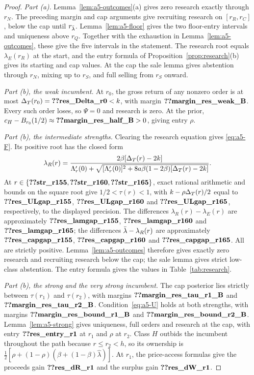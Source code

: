 \begin{proof}
\emph{Part (a).} Lemma~\ref{lem:a5-outcomes}(a) gives zero research exactly through \(r_N\).
The preceding margin and cap arguments give recruiting research on \([r_R,r_C]\), below the cap until
\(r_{\bar\lambda}\). Lemma~\ref{lem:a5-floor} gives the two floor-entry intervals and uniqueness above \(r_Q\).
Together with the exhaustion in Lemma~\ref{lem:a5-outcomes}, these give the five intervals in the statement.
The research root equals \(\lambda_E(r_R)\) at the start, and the entry formula of
Proposition~\ref{prop:research}(b) gives its starting and cap values. At the cap the sale lemma gives
abstention through \(r_N\), mixing up to \(r_S\), and full selling from \(r_S\) onward.

\emph{Part (b), the weak incumbent.} At \(r_0\), the gross return of any nonzero order is at most
\(\DT(r_0)=\reg{res_Delta_r0}<k\), with margin \(\reg{margin_res_weak_B}\).
Every such order loses, so \(\Psi=0\) and research is zero. At the prior,
\(c_H-B_{r_0}(1/2)\approx\reg{margin_res_half_B}>0\), giving entry \(\rho\).

\emph{Part (b), the intermediate strengths.} Clearing the research equation gives \eqref{eq:a5-F}.
Its positive root has the closed form
\[
 \lambda_R(r)=
 \frac{2\beta[\Delta_T(r)-2k]}
 {\Lambda_r'(0)+\sqrt{[\Lambda_r'(0)]^2+
 8a\beta(1-2\beta)[\Delta_T(r)-2k]}}.
\]
At \(r\in\{\reg{str_r155},\reg{str_r160},\reg{str_r165}\}\), exact rational arithmetic and bounds on
the square root give \(1/2<\tau(r)<1\), with
\(k-\rho\Delta_T(r)/2\) equal to \(\reg{res_ULgap_r155}\), \(\reg{res_ULgap_r160}\) and
\(\reg{res_ULgap_r165}\), respectively, to the displayed precision.
The differences \(\lambda_R(r)-\lambda_E(r)\) are approximately
\(\reg{res_lamgap_r155}\), \(\reg{res_lamgap_r160}\) and \(\reg{res_lamgap_r165}\);
the differences \(\bar\lambda-\lambda_R(r)\) are approximately
\(\reg{res_capgap_r155}\), \(\reg{res_capgap_r160}\) and \(\reg{res_capgap_r165}\).
All are strictly positive. Lemma~\ref{lem:a5-outcomes} therefore gives exactly zero research and recruiting
research below the cap; the sale lemma gives strict low-class abstention. The entry formula gives the
values in Table~\ref{tab:research}.

\emph{Part (b), the strong and the very strong incumbent.} The cap posterior lies strictly between
\(\tau(r_1)\) and \(\tau(r_2)\), with margins \(\reg{margin_res_tau_r1_B}\) and
\(\reg{margin_res_tau_r2_B}\). Condition~\eqref{eq:a5-U} holds at both strengths, with margins
\(\reg{margin_res_bound_r1_B}\) and \(\reg{margin_res_bound_r2_B}\).
Lemma~\ref{lem:a5-strong} gives uniqueness, full orders and research at the cap, with entry
\(\reg{res_entry_r1}\) at \(r_1\) and \(\rho\) at \(r_2\).
Class \(H\) outbids the incumbent throughout the path because \(r\le r_2<h\), so its ownership is
\(\tfrac12[\rho+(1-\rho)(\beta+(1-\beta)\hat\lambda)]\).
At \(r_1\), the price-access formulas give the proceeds gain \(\reg{res_dR_r1}\) and the surplus gain
\(\reg{res_dW_r1}\).
\end{proof}

